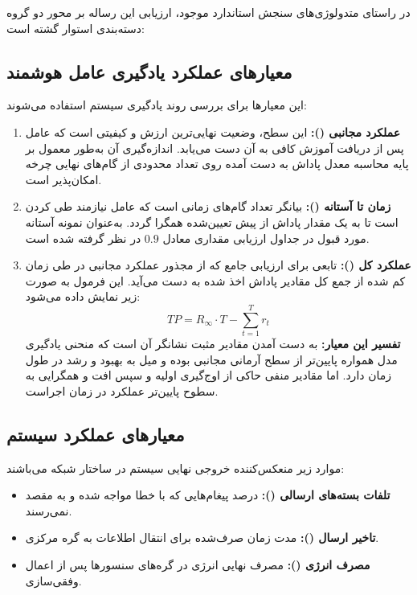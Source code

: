 \documentclass[oneside,openany,phd]{TMU-Thesis}
\begin{document}
در راستای متدولوژی‌های سنجش استاندارد موجود، ارزیابی این رساله بر محور دو گروه دسته‌بندی استوار گشته است:

\subsection{معیارهای عملکرد یادگیری عامل هوشمند}
این معیارها برای بررسی روند یادگیری سیستم استفاده می‌شوند:
\begin{enumerate}
  \item \textbf{عملکرد مجانبی ():} این سطح، وضعیت نهایی‌ترین ارزش و کیفیتی است که عامل پس از دریافت آموزش کافی به آن دست می‌یابد. اندازه‌گیری آن به‌طور معمول بر پایه محاسبه معدل پاداش به دست آمده روی تعداد محدودی از گام‌های نهایی چرخه امکان‌پذیر است.
  \item \textbf{زمان تا آستانه ():} بیانگر تعداد گام‌های زمانی است که عامل نیازمند طی کردن است تا به یک مقدار پاداش از پیش تعیین‌شده همگرا گردد. به‌عنوان نمونه آستانه مورد قبول در جداول ارزیابی مقداری معادل $0.9$ در نظر گرفته شده است.
  \item \textbf{عملکرد کل ():} تابعی برای ارزیابی جامع که از مجذور عملکرد مجانبی در طی زمان کم شده از جمع کل مقادیر پاداش اخذ شده به دست می‌آید. این فرمول به صورت زیر نمایش داده می‌شود:
  $$TP = R_{\infty}\cdot T - \sum_{t=1}^{T} r_t$$
  \textbf{تفسیر این معیار:} به دست آمدن مقادیر مثبت نشانگر آن است که منحنی یادگیری مدل همواره پایین‌تر از سطح آرمانی مجانبی بوده و میل به بهبود و رشد در طول زمان دارد. اما مقادیر منفی حاکی از اوج‌گیری اولیه و سپس افت و همگرایی به سطوح پایین‌تر عملکرد در زمان اجراست.
\end{enumerate}

\subsection{معیارهای عملکرد سیستم}
موارد زیر منعکس‌کننده خروجی نهایی سیستم در ساختار شبکه می‌باشند:
\begin{itemize}
  \item \textbf{تلفات بسته‌های ارسالی ():} درصد پیغام‌هایی که با خطا مواجه شده و به مقصد نمی‌رسند.
  \item \textbf{تاخیر ارسال ():} مدت زمان صرف‌شده برای انتقال اطلاعات به گره مرکزی.
  \item \textbf{مصرف انرژی ():} مصرف نهایی انرژی در گره‌های سنسورها پس از اعمال وفقی‌سازی.
\end{itemize}
\end{document}
